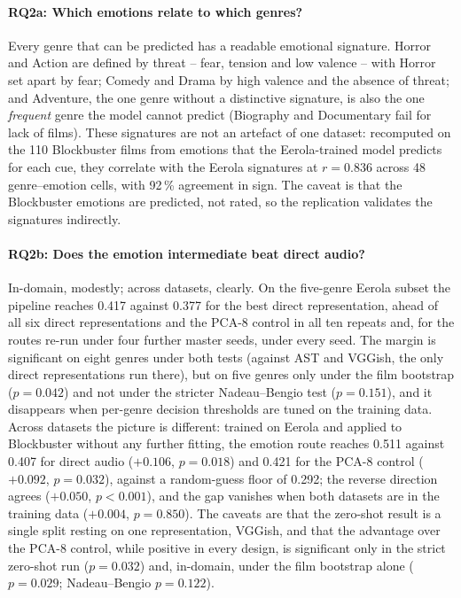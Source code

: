 \paragraph{RQ2a: Which emotions relate to which genres?}
Every genre that can be predicted has a readable emotional signature. Horror and Action are
defined by threat -- fear, tension and low valence -- with Horror set apart by fear; Comedy
and Drama by high valence and the absence of threat; and Adventure, the one genre without a
distinctive signature, is also the one \emph{frequent} genre the model cannot predict
(Biography and Documentary fail for lack of films). These signatures are not
an artefact of one dataset: recomputed on the 110 Blockbuster films from emotions that the
Eerola-trained model predicts for each cue, they correlate with the Eerola signatures at
$r=0.836$ across 48 genre--emotion cells, with 92\,\% agreement in sign. The caveat is that
the Blockbuster emotions are predicted, not rated, so the replication validates the
signatures indirectly.

\paragraph{RQ2b: Does the emotion intermediate beat direct audio?}
In-domain, modestly; across datasets, clearly. On the five-genre Eerola subset the pipeline
reaches 0.417 against 0.377 for the best direct representation, ahead of all six direct
representations and the PCA-8 control in all ten repeats and, for the routes re-run under
four further master seeds, under every seed. The margin is significant on eight genres under both tests (against AST and VGGish, the
only direct representations run there), but on five genres only under
the film bootstrap ($p=0.042$) and not under the stricter Nadeau--Bengio test ($p=0.151$),
and it disappears when per-genre decision thresholds are tuned on the training data. Across
datasets the picture is different: trained on Eerola and applied to Blockbuster without any
further fitting, the emotion route reaches 0.511 against 0.407 for direct audio ($+0.106$,
$p=0.018$) and 0.421 for the PCA-8 control ($+0.092$, $p=0.032$), against a random-guess
floor of 0.292; the reverse direction agrees ($+0.050$, $p<0.001$), and the gap vanishes
when both datasets are in the training data ($+0.004$, $p=0.850$). The caveats are that the
zero-shot result is a single split resting on one representation, VGGish, and that the
advantage over the PCA-8 control, while positive in every design, is significant only in the
strict zero-shot run ($p=0.032$) and, in-domain, under the film bootstrap alone ($p=0.029$;
Nadeau--Bengio $p=0.122$).

